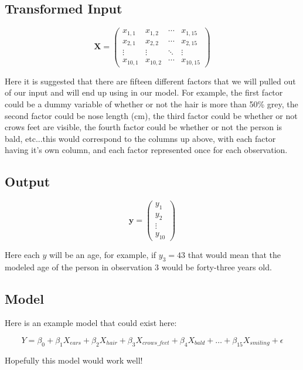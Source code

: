 \documentclass[11pt]{article}
\begin{document}
\subsection*{Transformed Input}

$$ \mathbf{X} = 
  \begin{pmatrix}
    x_{1,1}  & x_{1,2}  & \cdots & x_{1, 15} \\
    x_{2,1}  & x_{2,2}  & \cdots & x_{2, 15} \\
    \vdots   & \vdots   & \ddots & \vdots  \\
    x_{10,1} & x_{10,2} & \cdots & x_{10, 15} 
\end{pmatrix} $$

Here it is suggested that there are fifteen different factors that we will pulled out of our input and will end up using in our model. For example, the first factor could be a dummy variable of whether or not the hair is more than 50\% grey, the second factor could be nose length (cm), the third factor could be whether or not crows feet are visible, the fourth factor could be whether or not the person is bald, etc...this would correspond to the columns up above, with each factor having it's own column, and each factor represented once for each observation.

\subsection*{Output}

$$ \mathbf{y} = 
    \begin{pmatrix}
        y_1 \\
        y_2 \\
        \vdots \\
        y_{10}
    \end{pmatrix} $$

Here each $y$ will be an age, for example, if $y_3 = 43$ that would mean that the modeled age of the person in observation 3 would be forty-three years old.

\subsection*{Model}

Here is an example model that could exist here:

$$ Y = \beta_0 + \beta_1X_{ears} + \beta_2X_{hair} + \beta_3X_{crows\_feet} + \beta_4X_{bald} + \dotso + \beta_{15}X_{smiling} + \epsilon $$

Hopefully this model would work well!
\end{document}
